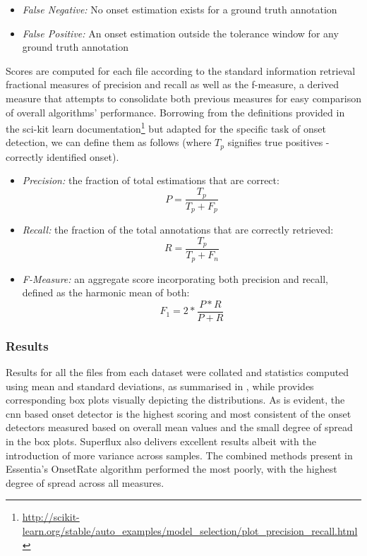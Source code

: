 \begin{itemize}
  \item \textit{False Negative:} No onset estimation exists for a ground truth annotation
  \item \textit{False Positive:} An onset estimation outside the tolerance window for any ground truth annotation
\end{itemize}

Scores are computed for each file according to the standard information retrieval fractional measures of precision and recall as well as the f-measure, a derived measure that attempts to consolidate both previous measures for easy comparison of overall algorithms’ performance. Borrowing from the definitions provided in the sci-kit learn documentation\footnote{\url{http://scikit-learn.org/stable/auto_examples/model_selection/plot_precision_recall.html}} but adapted for the specific task of onset detection, we can define them as follows (where $T_p$ signifies true positives - correctly identified onset).

\begin{itemize}
  \item \textit{Precision:} the fraction of total estimations that are correct:
\begin{equation}
\label{eq:Precision}	
P=\frac{T_{p}}{T_{p}+F_{p}}
\end{equation}  

  \item \textit{Recall:} the fraction of the total annotations that are correctly retrieved:
\begin{equation}
\label{eq:Precision}	
R=\frac{T_{p}}{T_{p}+F_{n}}
\end{equation}  

  \item \textit{F-Measure:} an aggregate score incorporating both precision and recall, defined as the harmonic mean of both:
\begin{equation}
\label{eq:Precision}	
F_{1}=2*\frac{P*R}{P+R}
\end{equation}  

\end{itemize}

\subsubsection{Results}

Results for all the files from each dataset were collated and statistics computed using mean and standard deviations, as summarised in , while  provides corresponding box plots visually depicting the distributions. As is evident, the \acrfull{cnn} based onset detector is the highest scoring and most consistent of the onset detectors measured based on overall mean values and the small degree of spread in the box plots. Superflux also delivers excellent results albeit with the introduction of more variance across samples. The combined methods present in Essentia's OnsetRate algorithm performed the most poorly, with the highest degree of spread across all measures.

